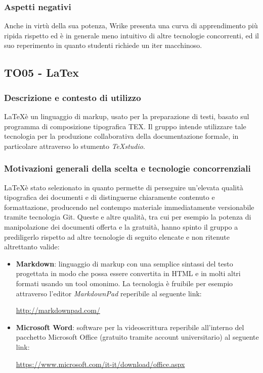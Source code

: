 \documentclass[./../Technology Baseline.tex]{subfiles}
\begin{document}
\subsubsection{Aspetti negativi}
Anche in virtù della sua potenza, Wrike presenta una curva di apprendimento più ripida rispetto ed è in generale meno intuitivo di altre tecnologie concorrenti, ed il suo reperimento in quanto studenti richiede un iter macchinoso.

\subsection{TO05 - LaTex}

\subsubsection{Descrizione e contesto di utilizzo}
\LaTeX è un linguaggio di markup, usato per la preparazione di testi, basato sul programma di composizione tipografica TEX. Il gruppo intende utilizzare tale tecnologia per la produzione collaborativa della documentazione formale, in particolare attraverso lo stumento \textit{TeXstudio}.

\subsubsection{Motivazioni generali della scelta e tecnologie concorrenziali}
\LaTeX è stato selezionato in quanto permette di perseguire un'elevata qualità tipografica dei documenti e di distinguerne chiaramente contenuto e formattazione, producendo nel contempo materiale immediatamente versionabile tramite tecnologia Git. Queste e altre qualità, tra cui per esempio la potenza di manipolazione dei documenti offerta e la gratuità, hanno spinto il gruppo a prediligerlo rispetto ad altre tecnologie di seguito elencate e non ritenute altrettanto valide:
\begin{itemize}
	\item \textbf{Markdown}: linguaggio di markup con una semplice sintassi del testo progettata in modo che possa essere convertita in HTML e in molti altri formati usando un tool omonimo. La tecnologia è fruibile per esempio attraverso l'editor \textit{MarkdownPad} reperibile al seguente link:
	\begin{center}
		\url{http://markdownpad.com/}
	\end{center}

	\item \textbf{Microsoft Word}: software per la videoscrittura reperibile all'interno del pacchetto Microsoft Office (gratuito tramite account universitario) al seguente link:
	\begin{center}
		\url{https://www.microsoft.com/it-it/download/office.aspx}
	\end{center} 
\end{itemize}  
\end{document}
